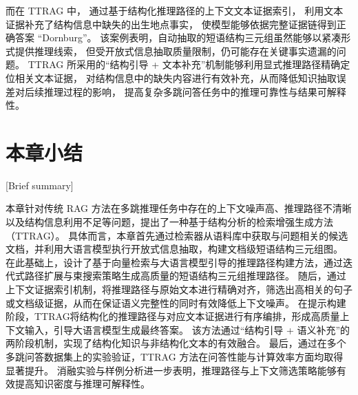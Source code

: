 而在 TTRAG 中，
通过基于结构化推理路径的上下文文本证据索引，
利用文本证据补充了结构信息中缺失的出生地点事实，
使模型能够依据完整证据链得到正确答案 ``Dornburg''。
该案例表明，自动抽取的短语结构三元组虽然能够以紧凑形式提供推理线索，
但受开放式信息抽取质量限制，仍可能存在关键事实遗漏的问题。
TTRAG 所采用的“结构引导 + 文本补充”机制能够利用显式推理路径精确定位相关文本证据，
对结构信息中的缺失内容进行有效补充，从而降低知识抽取误差对后续推理过程的影响，
提高复杂多跳问答任务中的推理可靠性与结果可解释性。




\section{本章小结}[Brief summary]

本章针对传统 RAG 方法在多跳推理任务中存在的上下文噪声高、推理路径不清晰以及结构信息利用不足等问题，提出了一种基于结构分析的检索增强生成方法（TTRAG）。
具体而言，本章首先通过检索器从语料库中获取与问题相关的候选文档，并利用大语言模型执行开放式信息抽取，构建文档级短语结构三元组图。
在此基础上，设计了基于向量检索与大语言模型引导的推理路径构建方法，通过迭代式路径扩展与束搜索策略生成高质量的短语结构三元组推理路径。
随后，通过上下文证据索引机制，将推理路径与原始文本进行精确对齐，筛选出高相关的句子或文档级证据，从而在保证语义完整性的同时有效降低上下文噪声。
在提示构建阶段，TTRAG将结构化的推理路径与对应文本证据进行有序编排，形成高质量上下文输入，引导大语言模型生成最终答案。
该方法通过“结构引导 + 语义补充”的两阶段机制，实现了结构化知识与非结构化文本的有效融合。
最后，通过在多个多跳问答数据集上的实验验证，TTRAG 方法在问答性能与计算效率方面均取得显著提升。
消融实验与样例分析进一步表明，推理路径与上下文筛选策略能够有效提高知识密度与推理可解释性。